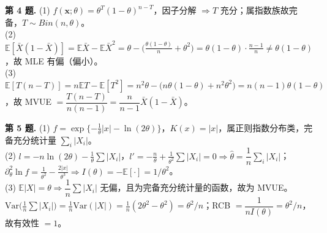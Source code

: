 \documentclass[12pt,a4paper]{ctexart}
\newcommand{\E}{\mathbb{E}}
\newcommand{\Var}{\mathrm{Var}}
\begin{document}
\smallskip
\noindent\textbf{第 4 题.}\;
(1) $f(\mathbf x;\theta)=\theta^{T}(1-\theta)^{n-T}$，因子分解 $\Rightarrow T$ 充分；属指数族故完备，$T\sim Bin(n,\theta)$。\\
(2) $\E[\bar X(1-\bar X)]=\E\bar X-\E\bar X^2=\theta-\big(\tfrac{\theta(1-\theta)}{n}+\theta^2\big)=\theta(1-\theta)\cdot\tfrac{n-1}{n}\neq\theta(1-\theta)$，故 MLE 有偏（偏小）。\\
(3) $\E[T(n-T)]=n\E T-\E[T^2]=n^2\theta-\big(n\theta(1-\theta)+n^2\theta^2\big)=n(n-1)\theta(1-\theta)$，故 MVUE $=\boxed{\dfrac{T(n-T)}{n(n-1)}}=\dfrac{n}{n-1}\bar X(1-\bar X)$。

\smallskip
\noindent\textbf{第 5 题.}\;
(1) $f=\exp\{-\tfrac1\theta|x|-\ln(2\theta)\}$，$K(x)=|x|$，属正则指数分布类，完备充分统计量 $\sum_i|X_i|$。\\
(2) $l=-n\ln(2\theta)-\tfrac1\theta\sum|X_i|$，$l'=-\tfrac n\theta+\tfrac1{\theta^2}\sum|X_i|=0\Rightarrow\hat\theta=\dfrac1n\sum_i|X_i|$；$\partial^2_\theta\ln f=\tfrac1{\theta^2}-\tfrac{2|x|}{\theta^3}\Rightarrow I(\theta)=-\E[\cdot]=1/\theta^2$。\\
(3) $\E|X|=\theta\Rightarrow\dfrac1n\sum|X_i|$ 无偏，且为完备充分统计量的函数，故为 MVUE。$\Var\big(\tfrac1n\sum|X_i|\big)=\tfrac1n\Var(|X|)=\tfrac1n(2\theta^2-\theta^2)=\theta^2/n$；RCB $=\dfrac1{nI(\theta)}=\theta^2/n$，故有效性 $=1$。
\end{document}
